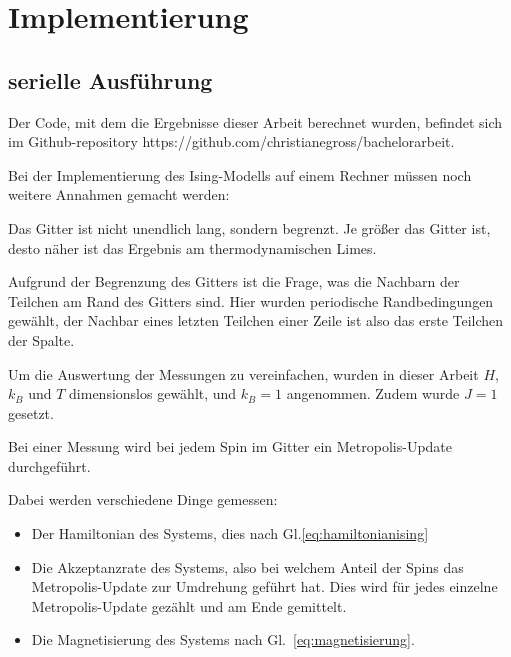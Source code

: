 	\chapter{Implementierung}
	\label{chap:implementierung}
	
	\section{serielle Ausführung}
	\label{sec:seriellimplementierung}
	
	Der Code, mit dem die Ergebnisse dieser Arbeit berechnet wurden, befindet sich im Github-repository https://github.com/christianegross/bachelorarbeit. %
	
	Bei der Implementierung des Ising-Modells auf einem Rechner müssen noch weitere Annahmen gemacht werden:
	
	Das Gitter ist nicht unendlich lang, sondern begrenzt. Je größer das Gitter ist, desto näher ist das Ergebnis am thermodynamischen Limes. 
	
	Aufgrund der Begrenzung des Gitters ist die Frage, was die Nachbarn der Teilchen am Rand des Gitters sind. Hier wurden periodische Randbedingungen gewählt, der Nachbar eines letzten Teilchen einer Zeile ist also das erste Teilchen der Spalte.
	
	Um die Auswertung der Messungen zu vereinfachen, wurden in dieser Arbeit $H$, $k_B$ und $T$ dimensionslos gewählt, und $k_B=1$ angenommen. Zudem wurde $J=1$ gesetzt.
	
	Bei einer Messung wird bei jedem Spin im Gitter ein Metropolis-Update durchgeführt.%
	
	Dabei werden verschiedene Dinge gemessen: \begin{itemize}
		\item Der Hamiltonian des Systems, dies nach Gl.\ref{eq:hamiltonianising}
		\item Die Akzeptanzrate des Systems, also bei welchem Anteil der Spins das Metropolis-Update zur Umdrehung geführt hat. Dies wird für jedes einzelne Metropolis-Update gezählt und am Ende gemittelt.
		\item Die Magnetisierung des Systems nach Gl.~\ref{eq:magnetisierung}. 
	\end{itemize}
	
